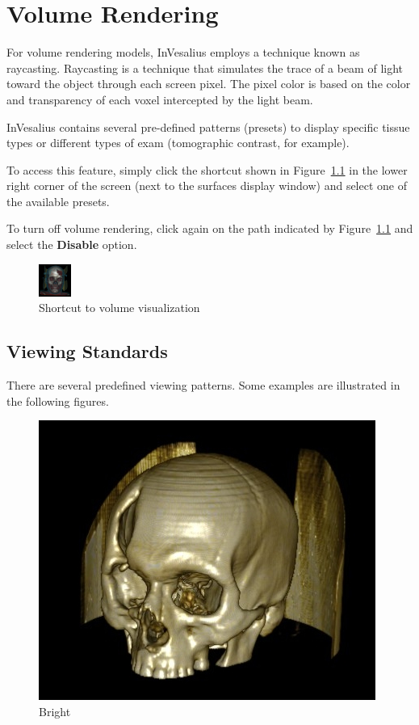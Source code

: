 \chapter{Volume Rendering}
\label{cap:vis_vol}

For volume rendering models, InVesalius employs a technique known as raycasting. Raycasting is a technique that simulates the trace of a beam of light toward the object through each screen pixel. The pixel color is based on the color and transparency of each voxel intercepted by the light beam.

InVesalius contains several pre-defined patterns (presets) to display specific tissue types or different types of exam (tomographic contrast, for example).

To access this feature, simply click the shortcut shown in Figure~\ref{fig:volume_raycasting_origina} in the lower right corner of the screen (next to the surfaces display window) and select one of the available presets.

To turn off volume rendering, click again on the path indicated by Figure~\ref{fig:volume_raycasting_origina} and select the \textbf{Disable} option.

\begin{figure}[!htb]
\centering
\includegraphics[scale=0.4]{../user_guide_figures/icons/volume_raycasting_origina.png}
\caption{Shortcut to volume visualization}
\label{fig:volume_raycasting_origina}
\end{figure}

\section{Viewing Standards}

There are several predefined viewing patterns. Some examples are illustrated in the following figures.

\begin{figure}[!htb]
\centering
\includegraphics[scale=0.68]{../user_guide_figures/invesalius_screen/brilhante_I.jpg}
\caption{Bright}
\label{fig:brilhante_I}
\end{figure}


